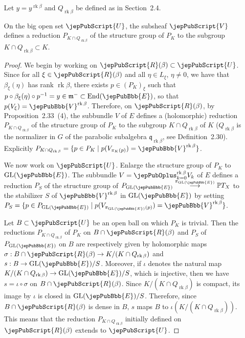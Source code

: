 Let $y=y^{\operatorname{rk}\beta}$ and $Q_{\operatorname{rk}\beta}$ be defined as in Section~2.4.
\begin{lemma}
On the big open set $\jepPubScript{U}$, the subsheaf $\jepPubScript{V}$ defines a reduction $P_{K\cap Q_{\operatorname{rk}\beta}}$ of the structure group of $P_K$ to the subgroup $K\cap Q_{\operatorname{rk}\beta}\subset K$.
\end{lemma}
\begin{proof}
We begin by working on $\jepPubScript{R}(\beta)\subset\jepPubScript{U}$. Since for all $\xi\in\jepPubScript{R}(\beta)$ and all $\eta\in L_\xi$, $\eta\neq0$, we have that $\beta_\xi(\eta)$ has rank $\operatorname{rk}\beta$, there exists $p\in(P_K)_\xi$ such that $p\circ\beta_\xi(\eta)\circ p^{-1}=y\in\mathfrak m^-\subset\operatorname{End}(\jepPubBbb{E})$, so that $p(V_\xi)=\jepPubBbb{V}^{\operatorname{rk}\beta}$. Therefore, on $\jepPubScript{R}(\beta)$, by Proposition~2.33~(4), the subbundle $V$ of $E$ defines a (holomorphic) reduction $P_{K\cap Q_{\operatorname{rk}\beta}}$ of the structure group of $P_K$ to the subgroup $K\cap Q_{\operatorname{rk}\beta}$ of $K$ ($Q_{\operatorname{rk}\beta}$ is the normalizer in $G$ of the parabolic subalgebra $\mathfrak q_{\operatorname{rk}\beta}$, see Definition~2.30). Explicitly $P_{K\cap Q_{\operatorname{rk}\beta}}=\{p\in P_K\mid p(V_{\pi_K(p)})=\jepPubBbb{V}^{\operatorname{rk}\beta}\}$.

We now work on $\jepPubScript{U}$. Enlarge the structure group of $P_K$ to $\operatorname{GL}(\jepPubBbb{E})$. The subbundle $V=\jepPubOplus_{k=0}^{\operatorname{rk}\beta}V_k$ of $E$ defines a reduction $P_S$ of the structure group of $P_{\operatorname{GL}(\jepPubBbb{E})}\overset{\pi_{\operatorname{GL}(\jepPubBbb{E})}}{\longrightarrow}\mathbb PT_X$ to the stabilizer $S$ of $\jepPubBbb{V}^{\operatorname{rk}\beta}$ in $\operatorname{GL}(\jepPubBbb{E})$ by setting $P_S=\{p\in P_{\operatorname{GL}(\jepPubBbb{E})}\mid p(V_{\pi_{\operatorname{GL}(\jepPubBbb{E})}(p)})=\jepPubBbb{V}^{\operatorname{rk}\beta}\}$.

Let $B\subset\jepPubScript{U}$ be an open ball on which $P_K$ is trivial. Then the reductions $P_{K\cap Q_{\operatorname{rk}\beta}}$ of $P_K$ on $B\cap\jepPubScript{R}(\beta)$ and $P_S$ of $P_{\operatorname{GL}(\jepPubBbb{E})}$ on $B$ are respectively given by holomorphic maps $\sigma:B\cap\jepPubScript{R}(\beta)\to K/(K\cap Q_{\operatorname{rk}\beta})$ and $s:B\to\operatorname{GL}(\jepPubBbb{E})/S$. Moreover, if $\iota$ denotes the natural map $K/(K\cap Q_{\operatorname{rk}\beta})\to\operatorname{GL}(\jepPubBbb{E})/S$, which is injective, then we have $s=\iota\circ\sigma$ on $B\cap\jepPubScript{R}(\beta)$. Since $K/(K\cap Q_{\operatorname{rk}\beta})$ is compact, its image by $\iota$ is closed in $\operatorname{GL}(\jepPubBbb{E})/S$. Therefore, since $B\cap\jepPubScript{R}(\beta)$ is dense in $B$, $s$ maps $B$ to $\iota(K/(K\cap Q_{\operatorname{rk}\beta}))$. This means that the reduction $P_{K\cap Q_{\operatorname{rk}\beta}}$ initially defined on $\jepPubScript{R}(\beta)$ extends to $\jepPubScript{U}$.
\end{proof}
